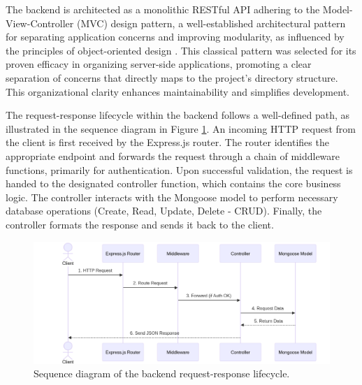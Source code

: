The backend is architected as a monolithic RESTful API adhering to the Model-View-Controller (MVC) design pattern, a well-established architectural pattern for separating application concerns and improving modularity, as influenced by the principles of object-oriented design \cite{Gamma1995DesignPatterns}. This classical pattern was selected for its proven efficacy in organizing server-side applications, promoting a clear separation of concerns that directly maps to the project's directory structure. This organizational clarity enhances maintainability and simplifies development.

\textgap

The request-response lifecycle within the backend follows a well-defined path, as illustrated in the sequence diagram in Figure \ref{fig:backend-lifecycle}. An incoming HTTP request from the client is first received by the Express.js router. The router identifies the appropriate endpoint and forwards the request through a chain of middleware functions, primarily for authentication. Upon successful validation, the request is handed to the designated controller function, which contains the core business logic. The controller interacts with the Mongoose model to perform necessary database operations (Create, Read, Update, Delete - CRUD). Finally, the controller formats the response and sends it back to the client.

\begin{figure}[H]
    \centering
    \includegraphics[width=\textwidth]{images/backend-lifecycle-diagram.png}
    \caption{Sequence diagram of the backend request-response lifecycle.}
    \label{fig:backend-lifecycle}
\end{figure}

